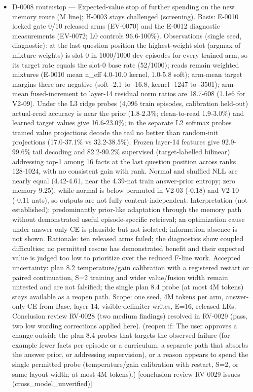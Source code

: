 \documentclass[11pt]{article}
\begin{document}
\begin{itemize}
\item D-0008 route:stop --- Expected-value stop of further spending on the new memory route (M line); H-0003 stays challenged (screening). Basis: E-0010 locked gate 0/10 released arms (EV-0070) and the E-0012 diagnostic measurements (EV-0072; L0 controls 96.6-100\%). Observations (single seed, diagnostic): at the last question position the highest-weight slot (argmax of mixture weights) is slot 0 in 1000/1000 dev episodes for every trained arm, so its target rate equals the slot-0 base rate (52/1000); reads remain weighted mixtures (E-0010 mean n\_eff 4.0-10.0 kernel, 1.0-5.8 soft); arm-mean target margins there are negative (soft -2.1 to -16.8, kernel -1247 to -3501); arm-mean fused-increment to layer-14 residual norm ratios are 18.7-608 (1.1e6 for V2-09). Under the L3 ridge probes (4,096 train episodes, calibration held-out) actual-read accuracy is near the prior (1.8-2.3\%; clean-to-read 1.9-3.0\%) and learned target values give 16.6-23.0\%; in the separate L2 softmax probes trained value projections decode the tail no better than random-init projections (17.0-37.1\% vs 32.2-38.5\%). Frozen layer-14 features give 92.9-99.6\% tail decoding and 82.2-90.2\% supervised (target-labelled bilinear) addressing top-1 among 16 facts at the last question position across ranks 128-1024, with no consistent gain with rank. Normal and shuffled NLL are nearly equal (4.42-4.61, near the 4.39-nat train answer-prior entropy; zero memory 9.25), while normal is below permuted in V2-03 (-0.18) and V2-10 (-0.11 nats), so outputs are not fully content-independent. Interpretation (not established): predominantly prior-like adaptation through the memory path without demonstrated useful episode-specific retrieval; an optimization cause under answer-only CE is plausible but not isolated; information absence is not shown. Rationale: ten released arms failed; the diagnostics show coupled difficulties; no permitted rescue has demonstrated benefit and their expected value is judged too low to prioritize over the reduced F-line work. Accepted uncertainty: plan 8.2 temperature/gain calibration with a registered restart or paired continuation, S=2 training and wider value/fusion width remain untested and are not falsified; the single plan 8.4 probe (at most 4M tokens) stays available as a reopen path. Scope: one seed, 4M tokens per arm, answer-only CE from Base, layer 14, visible-delimiter writes, E=16, released LRs. Conclusion review RV-0028 (two medium findings) resolved in RV-0029 (pass, two low wording corrections applied here). (reopen if: The user approves a change outside the plan 8.4 probes that targets the observed failure (for example fewer facts per episode or a curriculum, a separate path that absorbs the answer prior, or addressing supervision), or a reason appears to spend the single permitted probe (temperature/gain calibration with restart, S=2, or same-layout width; at most 4M tokens).) [conclusion review RV-0029 issues (cross\_model\_unverified)]

\end{itemize}
\end{document}
